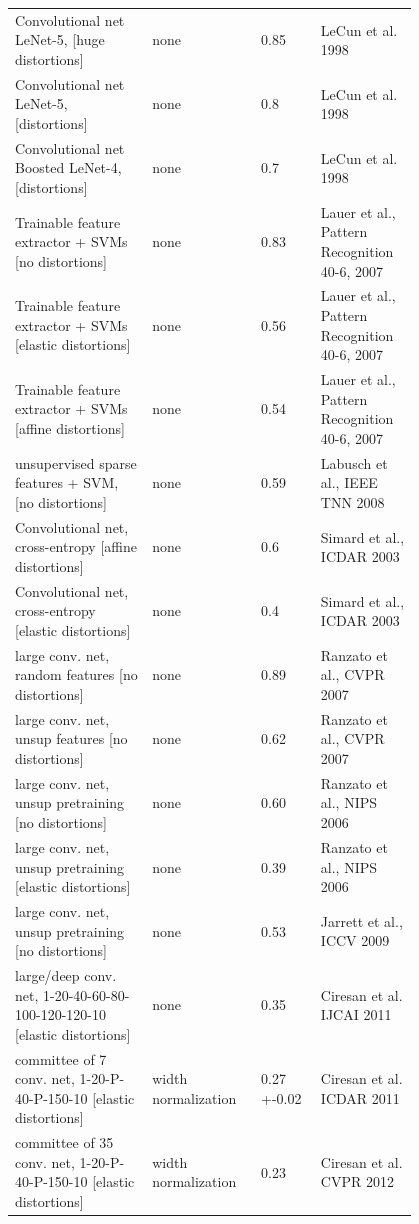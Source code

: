 \documentclass[utf8,usehyperref,14pt]{G7-32}
\begin{document}
\begin{longtable}{p{0.3\linewidth}|p{0.2\linewidth}|p{0.1\linewidth}|p{0.2\linewidth}}
Convolutional net LeNet-5, [huge distortions] & none & 0.85 & LeCun et al. 1998  \\ 
Convolutional net LeNet-5, [distortions] & none & 0.8 & LeCun et al. 1998  \\ 
Convolutional net Boosted LeNet-4, [distortions] & none & 0.7 & LeCun et al. 1998  \\ 
Trainable feature extractor + SVMs [no distortions] & none & 0.83 & Lauer et al., Pattern Recognition 40-6, 2007  \\ 
Trainable feature extractor + SVMs [elastic distortions] & none & 0.56 & Lauer et al., Pattern Recognition 40-6, 2007  \\ 
Trainable feature extractor + SVMs [affine distortions] & none & 0.54 & Lauer et al., Pattern Recognition 40-6, 2007  \\ 
unsupervised sparse features + SVM, [no distortions] & none & 0.59 & Labusch et al., IEEE TNN 2008 \\ 
Convolutional net, cross-entropy [affine distortions] & none & 0.6 & Simard et al., ICDAR 2003  \\ 
Convolutional net, cross-entropy [elastic distortions] & none & 0.4 & Simard et al., ICDAR 2003  \\ 
large conv. net, random features [no distortions] & none & 0.89 & Ranzato et al., CVPR 2007  \\
large conv. net, unsup features [no distortions] & none & 0.62 & Ranzato et al., CVPR 2007  \\ 
large conv. net, unsup pretraining [no distortions] & none & 0.60 & Ranzato et al., NIPS 2006  \\ 
large conv. net, unsup pretraining [elastic distortions] & none & 0.39 & Ranzato et al., NIPS 2006  \\ 
large conv. net, unsup pretraining [no distortions] & none & 0.53 & Jarrett et al., ICCV 2009 \\ 
large/deep conv. net, 1-20-40-60-80-100-120-120-10 [elastic distortions] & none & 0.35 & Ciresan et al. IJCAI 2011 \\ 
committee of 7 conv. net, 1-20-P-40-P-150-10 [elastic distortions] & width normalization & 0.27 +-0.02 & Ciresan et al. ICDAR 2011  \\ 
committee of 35 conv. net, 1-20-P-40-P-150-10 [elastic distortions] & width normalization & 0.23 & Ciresan et al. CVPR 2012  \\ 
\end{longtable}
\end{document}
